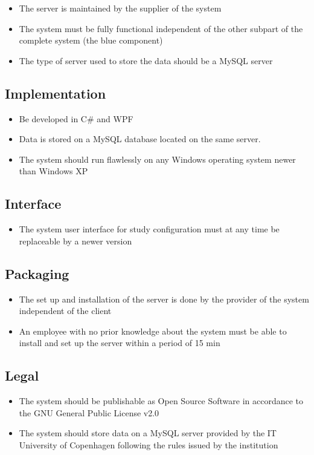 \begin{itemize}
\item The server is maintained by the supplier of the system
\item The system must be fully functional independent of the other subpart of the complete system (the blue component)
\item The type of server used to store the data should be a MySQL server
\end{itemize}

\subsection{Implementation}

\begin{itemize}
\item Be developed in C\# and WPF
\item Data is stored on a MySQL database located on the same server.
\item The system should run flawlessly on any Windows operating system newer than Windows XP
\end{itemize}

\subsection{Interface}

\begin{itemize}
\item The system user interface for study configuration must at any time be replaceable by a newer version
\end{itemize}

\subsection{Packaging}

\begin{itemize}
\item The set up and installation of the server is done by the provider of the system independent of the client
\item An employee with no prior knowledge about the system must be able to install and set up the server within a period of 15 min
\end{itemize}

\subsection{Legal}

\begin{itemize}
\item The system should be publishable as Open Source Software in accordance to the GNU General Public License v2.0
\item The system should store data on a MySQL server provided by the IT University of Copenhagen following the rules issued by the institution
\end{itemize}

